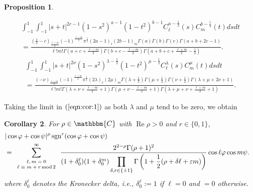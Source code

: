 \documentclass[12pt]{article}
\numberwithin{equation}{section}
\newcommand{\assign}{:=}
\newcommand{\tmdummy}{$\mbox{}$}
\newcommand{\tmop}[1]{\ensuremath{\operatorname{#1}}}
\newcommand{\tmscript}[1]{\text{\scriptsize{$#1$}}}
\newtheorem{corollary}{Corollary}[section]
{\theorembodyfont{\rmfamily}\newtheorem{example}[corollary]{Example}}
\newtheorem{proposition}[corollary]{Proposition}
{\theorembodyfont{\rmfamily}\newtheorem{remark}[corollary]{Remark}}
\begin{document}
\begin{proposition}
  \label{cor:1}{\tmdummy}
  
  \begin{multline}
    \displaystyle\int_{- 1}^1 \displaystyle\int_{- 1}^1 | s + t |^{2 c-1} (1 - s^2)^{a-1
	    } (1 - t^2)^{b-1} C_{\ell}^{a-\frac{1}{2}} (s)
	    C_m^{b-\frac{1}{2}} (t) d s d t   \\
	    \displaystyle = \frac{(\frac{1}{2}- c)_{\frac{\ell + m}{2}} (- 1)^{\frac{\ell + m}{2}}
    \pi^{\frac{1}{2}} (2a-1)_{\ell} (2 b-1)_m \Gamma \left( 
    a \right) \Gamma \left( b \right) \Gamma \left(
    c \right) \Gamma (a+b+2c-1)}{\ell !m!
    \Gamma \left( a+c + \frac{\ell - m}{2}  \right) \Gamma \left(
    b+c - \frac{\ell - m}{2}  \right) \Gamma \left( a+b +
    c + \frac{\ell + m}{2} -\frac{1}{2} \right)} . 
    \end{multline}
    \begin{multline}
    \displaystyle\int_{- 1}^1 \displaystyle\int_{- 1}^1 | s + t |^{2 \nu} (1 - s^2)^{\lambda -
    \frac{1}{2}} (1 - t^2)^{\mu - \frac{1}{2}} C_{\ell}^{\lambda} (s)
    C_m^{\mu} (t) d s d t   \\
    \displaystyle = \frac{(- \nu)_{\frac{\ell + m}{2}} (- 1)^{\frac{\ell + m}{2}}
    \pi^{\frac{1}{2}} (2 \lambda)_{\ell} (2 \mu)_m \Gamma \left( \lambda +
    \frac{1}{2} \right) \Gamma \left( \mu + \frac{1}{2} \right) \Gamma \left(
    \nu + \frac{1}{2} \right) \Gamma (\lambda + \mu + 2 \nu + 1)}{\ell !m!
    \Gamma \left( \lambda + \nu + \frac{\ell - m}{2} + 1 \right) \Gamma \left(
    \mu + \nu - \frac{\ell - m}{2} + 1 \right) \Gamma \left( \lambda + \mu +
    \nu + \frac{\ell + m}{2} + 1 \right)}  \label{eqn:cor:1} .
  \end{multline}
\end{proposition}

Taking the limit in $(\ref{eqn:cor:1})$ as both $\lambda$ and
$\mu$ tend to be
zero, we obtain

\begin{corollary}
  \label{cor:170599}For $\rho \in \mathbbm{C}$ with $\tmop{Re} \rho > 0$ and
  $r \in \{ 0, 1 \}$,
  \begin{eqnarray}
    & | \cos \varphi + \cos \psi |^{\rho} \tmop{sgn}^r (\cos \varphi + \cos
    \psi) &  \nonumber\\
    & = \displaystyle\sum_{\tmscript{\begin{array}{c}
      \ell, m = 0\\
      \ell \equiv m + r \tmop{mod} 2
    \end{array}}}^{\infty} \frac{2^{2 - \rho} \Gamma (\rho + 1)^2}{(1 +
    \delta_0^{\ell}) (1 + \delta_0^m) \displaystyle\prod_{\delta, \varepsilon \in \{ \pm 1
    \}} \Gamma \left( 1 + \frac{1}{2} (\rho + \delta \ell + \varepsilon m)
    \right)} \cos \ell \varphi \cos m \psi . &  \nonumber
  \end{eqnarray}
  where
  $\delta_0^\ell$ denotes the Kronecker delta, i.e.,
  $\delta_0^{\ell} \assign 1$ if $\ell = 0$ and $= 0$ otherwise.
\end{corollary}
\end{document}
